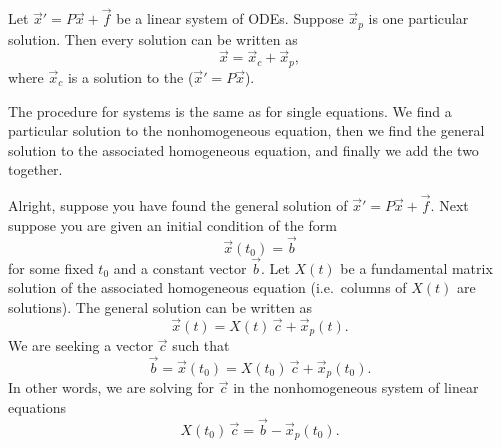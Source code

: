 \begin{theorem1}{}
Let
${\vec{x}}' = P\vec{x} + \vec{f}$ be a linear system of ODEs.
Suppose $\vec{x}_p$ is one particular solution.  Then every solution
can be written as
\begin{equation*}
\vec{x} = \vec{x}_c + \vec{x}_p ,
\end{equation*}
where $\vec{x}_c$ is a solution to the
(${\vec{x}}' = P\vec{x}$).
\end{theorem1}

The procedure for systems is the same as for single equations.
We find a particular solution
to the nonhomogeneous equation, then we find the general solution to the
associated homogeneous equation, and finally we add the two together.

\medskip

Alright, suppose you have found the general solution of
${\vec{x}}' = P\vec{x} + \vec{f}$.  Next suppose you are given an
initial condition of the form
\begin{equation*}
\vec{x}(t_0) = \vec{b}
\end{equation*}
for some fixed $t_0$ and a constant
vector $\vec{b}$.  Let $X(t)$ be a fundamental matrix solution
of the associated homogeneous equation
(i.e.\ columns of $X(t)$ are solutions).  The general solution can be
written as
\begin{equation*}
\vec{x}(t) = X(t)\,\vec{c} + \vec{x}_p(t).
\end{equation*}
We are seeking a vector 
$\vec{c}$ such that
\begin{equation*}
\vec{b} = \vec{x}(t_0) = X(t_0)\,\vec{c} + \vec{x}_p(t_0).
\end{equation*}
In other words, we are solving for $\vec{c}$ in the nonhomogeneous system of linear equations
\begin{equation*}
X(t_0)\,\vec{c} = \vec{b} - \vec{x}_p(t_0) .
\end{equation*}

